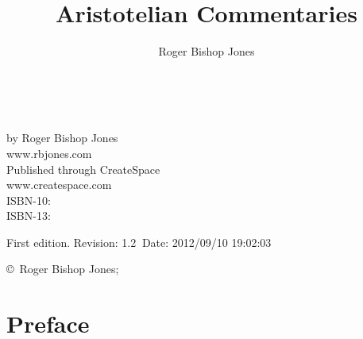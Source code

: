\newcommand{\indexentry}[2]{\item #1 #2}

\newcommand{\ignore}[1]{}

\title{Aristotelian Commentaries}
\author{Roger Bishop Jones}
\date{\ }




\frontmatter

\begin{titlepage}
\maketitle

\hspace{2in}

\vfill

\begin{centering}

\vfill

\vspace{0.1in}
by Roger Bishop Jones\\
www.rbjones.com\\
\vspace{0.2in}
Published through CreateSpace\\
www.createspace.com\\
\vspace{0.2in}
ISBN-10: \\
ISBN-13: \\
\vspace{0.2in}

{\footnotesize

First edition. $ $Revision: 1.2 $~$Date: 2012/09/10 19:02:03 $ $

\copyright\ Roger Bishop Jones;

}%

\end{centering}

\thispagestyle{empty}
\end{titlepage}

{\parskip=0pt\tableofcontents}

\vfill

\pagebreak

\chapter*{Preface}

